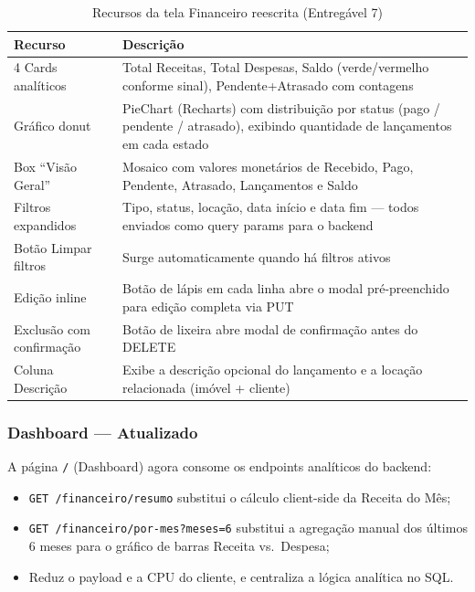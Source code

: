 \documentclass[12pt, a4paper]{article}
\newcommand{\thead}[1]{\cellcolor{tableheader}\color{white}\bfseries #1}
\newcommand{\talt}{\rowcolor{tablerowalt}}
\begin{document}
\begin{table}[H]
\centering
\begin{tabularx}{\textwidth}{|l|X|}
\hline
\thead{Recurso} & \thead{Descrição} \\
\hline
4 Cards analíticos      & Total Receitas, Total Despesas, Saldo (verde/vermelho conforme sinal), Pendente+Atrasado com contagens \\
\talt Gráfico donut       & PieChart (Recharts) com distribuição por status (pago / pendente / atrasado), exibindo quantidade de lançamentos em cada estado \\
Box ``Visão Geral''     & Mosaico com valores monetários de Recebido, Pago, Pendente, Atrasado, Lançamentos e Saldo \\
\talt Filtros expandidos  & Tipo, status, locação, data início e data fim — todos enviados como query params para o backend \\
Botão Limpar filtros    & Surge automaticamente quando há filtros ativos \\
\talt Edição inline       & Botão de lápis em cada linha abre o modal pré-preenchido para edição completa via PUT \\
Exclusão com confirmação & Botão de lixeira abre modal de confirmação antes do DELETE \\
\talt Coluna Descrição    & Exibe a descrição opcional do lançamento e a locação relacionada (imóvel + cliente) \\
\hline
\end{tabularx}
\caption{Recursos da tela Financeiro reescrita (Entregável 7)}
\end{table}

\subsubsection{Dashboard — Atualizado}

A página \texttt{/} (Dashboard) agora consome os endpoints analíticos do backend:

\begin{itemize}[leftmargin=1.5em]
  \item \texttt{GET /financeiro/resumo} substitui o cálculo client-side da Receita do Mês;
  \item \texttt{GET /financeiro/por-mes?meses=6} substitui a agregação manual dos últimos 6 meses para o gráfico de barras Receita vs.\ Despesa;
  \item Reduz o payload e a CPU do cliente, e centraliza a lógica analítica no SQL.
\end{itemize}
\end{document}
